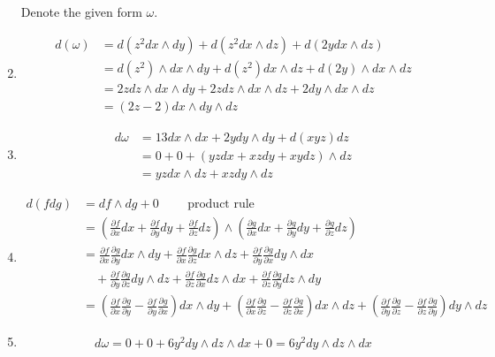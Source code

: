 \documentclass[12pt]{article}
\begin{document}
\begin{problem}[4.5.1]
\begin{enumerate}[label=(\alph*)]
Denote the given form $ \omega$.
	\item
		\begin{align*}
			d(\omega)& = d(z^2 dx \wedge dy) + d(z^2 dx \wedge dz) + d(2y dx \wedge dz)\\
			&= d(z^2) \wedge dx \wedge dy + d(z^2) dx \wedge dz + d(2y) \wedge dx \wedge dz \\
			&= 2z dz \wedge dx \wedge dy + 2z dz \wedge dx \wedge dz + 2 dy \wedge dx \wedge dz \\
			&= (2z- 2) dx \wedge dy \wedge dz 
		\end{align*}
	\item 
		\begin{align*}
			d\omega &= 13 dx \wedge dx + 2y dy \wedge dy +d(xyz) dz \\
			&= 0+ 0+ (yzdx+ xzdy+xydz) \wedge dz \\
			&= yz dx \wedge dz + xz dy \wedge dz
		\end{align*}
	\item 
		\begin{align*}
			d(f dg) &= df \wedge d g + 0 \qquad \text{  product rule}  \\
			&= \left( \frac{\partial f}{\partial x} dx + \frac{\partial f}{\partial y} dy + \frac{\partial f}{\partial z} dz \right) \wedge  \left( \frac{\partial g}{\partial x} dx + \frac{\partial g}{\partial y} dy + \frac{\partial g}{\partial z} dz \right)\\
			&= \frac{\partial f}{\partial x} \frac{\partial g}{\partial y}  dx  \wedge dy  + \frac{\partial f}{\partial x} \frac{\partial g}{\partial z}  dx  \wedge dz + \frac{\partial f}{\partial y} \frac{\partial g}{\partial x}  dy  \wedge dx \\
			&\quad + \frac{\partial f}{\partial y} \frac{\partial g}{\partial z}  dy\wedge dz + \frac{\partial f}{\partial z} \frac{\partial g}{\partial x}  dz  \wedge dx+\frac{\partial f}{\partial z} \frac{\partial g}{\partial y}  dz  \wedge dy\\
			&= \left(\frac{\partial f}{\partial x} \frac{\partial g}{\partial y} -  \frac{\partial f}{\partial y} \frac{\partial g}{\partial x}   \right) dx \wedge dy + \left(\frac{\partial f}{\partial x} \frac{\partial g}{\partial z} -  \frac{\partial f}{\partial z} \frac{\partial g}{\partial x}   \right) dx \wedge dz + \left(\frac{\partial f}{\partial y} \frac{\partial g}{\partial z} -  \frac{\partial f}{\partial z} \frac{\partial g}{\partial y} \right) dy \wedge dz
		\end{align*}
	\item 
		\begin{align*}
			d \omega = 0+0+ 6y^2 dy \wedge dz \wedge dx + 0 = 6y^2 dy \wedge dz \wedge dx
		\end{align*}
\end{enumerate}
\end{problem}
\end{document}
